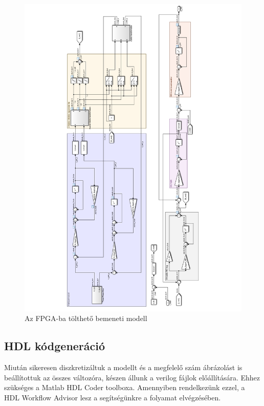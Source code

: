 \begin{figure}[h]
	\centering
	\includegraphics[width = 1.1\textwidth]{figures/hil_model_disc.pdf}
	\caption{Az FPGA-ba tölthető bemeneti modell} 
	\label{fig:floating}
\end{figure}


\subsection{HDL kódgeneráció}

Miután sikeresen diszkretizáltuk a modellt és a megfelelő szám ábrázolást is beállítottuk az összes változóra, készen állunk a verilog fájlok előállítására. Ehhez szükséges a Matlab HDL Coder toolboxa. Amennyiben rendelkezünk ezzel, a HDL Workflow Advisor lesz a segítségünkre a folyamat elvégzésében.

